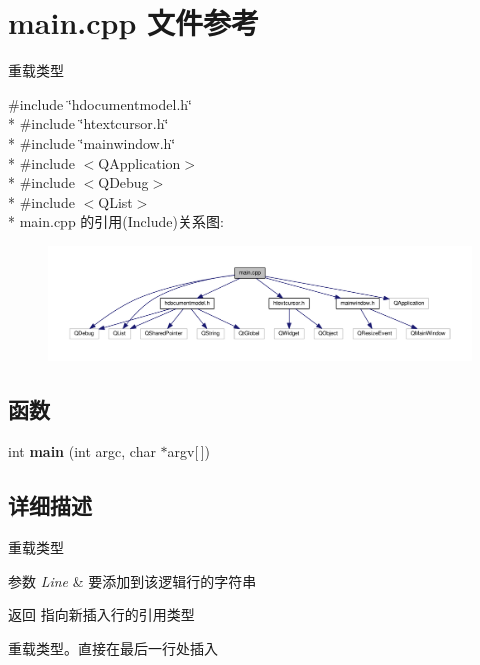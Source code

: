 \section{main.\+cpp 文件参考}
\label{main_8cpp}


重载类型  


{\ttfamily \#include \char`\"{}hdocumentmodel.\+h\char`\"{}}\\*
{\ttfamily \#include \char`\"{}htextcursor.\+h\char`\"{}}\\*
{\ttfamily \#include \char`\"{}mainwindow.\+h\char`\"{}}\\*
{\ttfamily \#include $<$Q\+Application$>$}\\*
{\ttfamily \#include $<$Q\+Debug$>$}\\*
{\ttfamily \#include $<$Q\+List$>$}\\*
main.\+cpp 的引用(Include)关系图\+:\nopagebreak
\begin{figure}[H]
\begin{center}
\leavevmode
\includegraphics[width=350pt]{main_8cpp__incl}
\end{center}
\end{figure}
\subsection*{函数}
\begin{DoxyCompactItemize}
\item 
int {\bfseries main} (int argc, char $\ast$argv[$\,$])\label{main_8cpp_a0ddf1224851353fc92bfbff6f499fa97}

\end{DoxyCompactItemize}


\subsection{详细描述}
重载类型 


\begin{DoxyParams}{参数}
{\em Line} & 要添加到该逻辑行的字符串 \\
\hline
\end{DoxyParams}
\begin{DoxyReturn}{返回}
指向新插入行的引用类型
\end{DoxyReturn}
重载类型。直接在最后一行处插入 